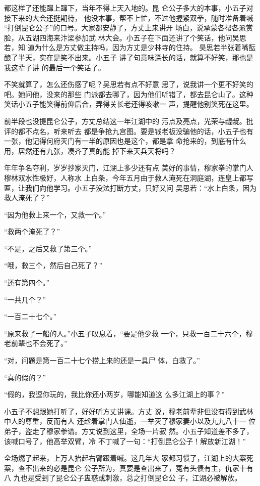 都这样了还能蹿上蹿下，当年不得上天入地的。昆
仑公子多大的本事，小五子对接下来的大会还挺期待，
他没本事，帮不上忙，不过他握紧双拳，随时准备着喊
“打倒昆仑公子”的口号。大家都安静了，方丈上来讲开
场白，说承蒙各帮各派赏脸，从五湖四海来汴梁参加武
林大会。小五子在下面还讲了个笑话，他问吴思若，知
道为什么是方丈做主持吗，因为方丈是少林寺的住持。
昊思若半张着嘴酝酿了半天，实在是笑不出来。小五子
讲了句意味深长的话，就算不好笑，那也是我这辈子讲
的最后一个笑话了。

不笑就算了，怎么还伤感了呢？吴思若有点不好意
思了，说我讲一个更不好笑的吧。她问他，没来的那些
门派都去哪了，因为他们听错了，都去昆仑山了。这种
笑话小五子能笑得前仰后合，弄得关长老还得咳嗽一
声，提醒他别笑死在这里。

前半段也没提昆仑公子，方丈总结这一年江湖中的
污点及亮点，光荣与龌龊。批评的都不点名，听来听去
都是争抢九宫图。要是钱老板没骗他的话，小五子也有
一张，他记得何府灭门有一半的原因也是这个，都是拿
命抢来的，到底有什么用，居然还有九张，凑齐了真的能
掉下来天兵天将吗？

年年争名夺利，岁岁抄家灭门，江湖上多少还有点
美好的事情，穆家拳的掌门人穆林双水性极好，人称水
上白条，今年五月由于救人淹死在洞庭湖，连皇上都写
匾，让我们向他学习。小五子没法打断方丈，只好又问
吴思若：“水上白条，因为救人淹死了？”

“因为他救上来一个，又救一个。”

“救两个淹死了？”

“不是，之后又救了第三个。”

“哦，救三个，然后自己死了？”

“还有第四个。”

“一共几个？”

“一百二十七个。”

“原来救了一船的人。”小五子叹息着，“要是他少救
一个，只救一百二十六个，穆老前辈也不会死了。”

“对，问题是第一百二十七个捞上来的还是一具尸
体，白救了。”

“真的假的？”

“假的，我逗你玩的，我比你还小两岁，哪能知道这
么多江湖上的事？”

小五子不想跟她打听了，好好听方丈讲课。方丈
说，穆老前辈非但没有得到武林中人的尊重，反而有人
还趁着掌门人仙逝，一举灭了穆家妻小以及九九八十一
位弟子，盗走了穆家拳谱。方丈说到这里，全场一片寂
然。小五子知道差不多了，该喊口号了，他高举双臂，冷
不丁喊了一句：“打倒昆仑公子！解放新江湖！”

全场燃了起来，上万人抬起右臂跟着喊。这几年大
家都习惯了，江湖上的大案死案，查不出来的必是昆仑
公子所为，真要是查出来了，冤有头债有主，仇家十有八
九也是受到了昆仑公子盅惑或刺激，总之打倒昆仑公
子，江湖必被解放。

